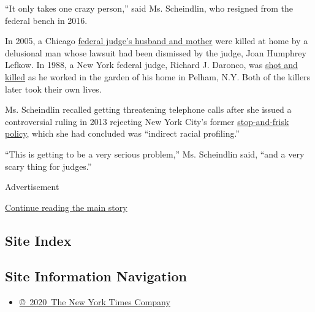 ``It only takes one crazy person,'' said Ms. Scheindlin, who resigned
from the federal bench in 2016.

In 2005, a Chicago
\href{https://www.nytimes3xbfgragh.onion/2005/03/11/us/electrician-says-in-suicide-note-that-he-killed-judges-family.html}{federal
judge's husband and mother} were killed at home by a delusional man
whose lawsuit had been dismissed by the judge, Joan Humphrey Lefkow. In
1988, a New York federal judge, Richard J. Daronco, was
\href{https://www.nytimes3xbfgragh.onion/1988/05/22/nyregion/federal-judge-slain-by-a-gunman-in-westchester.html}{shot
and killed} as he worked in the garden of his home in Pelham, N.Y. Both
of the killers later took their own lives.

Ms. Scheindlin recalled getting threatening telephone calls after she
issued a controversial ruling in 2013 rejecting New York City's former
\href{https://www.nytimes3xbfgragh.onion/2013/08/13/nyregion/stop-and-frisk-practice-violated-rights-judge-rules.html}{stop-and-frisk
policy}, which she had concluded was ``indirect racial profiling.''

``This is getting to be a very serious problem,'' Ms. Scheindlin said,
``and a very scary thing for judges.''

Advertisement

\protect\hyperlink{after-bottom}{Continue reading the main story}

\hypertarget{site-index}{%
\subsection{Site Index}\label{site-index}}

\hypertarget{site-information-navigation}{%
\subsection{Site Information
Navigation}\label{site-information-navigation}}

\begin{itemize}
\tightlist
\item
  \href{https://help.nytimes3xbfgragh.onion/hc/en-us/articles/115014792127-Copyright-notice}{©~2020~The
  New York Times Company}
\end{itemize}

